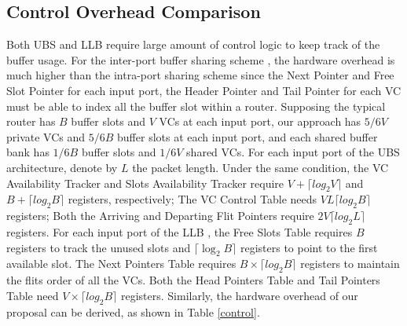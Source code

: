 \documentclass[10pt,conference]{IEEEtran}
\begin{document}
\subsection{Control Overhead Comparison}\label{controllogic}
Both UBS \cite{NPKV06}\cite{5770788} and LLB \cite{4555894}\cite{Neishaburi:2009:RAN:1531542.1531658} require large amount of control logic to keep track of the buffer usage. For the inter-port buffer sharing scheme \cite{Neishaburi:2009:RAN:1531542.1531658}, the hardware overhead is much higher than the intra-port sharing scheme since the Next Pointer and Free Slot Pointer for each input port, the Header Pointer and Tail Pointer for each VC must be able to index all the buffer slot within a router. Supposing the typical router \cite{NPKV06}\cite{5770788}\cite{4555894}\cite{Neishaburi:2009:RAN:1531542.1531658} has $B$ buffer slots and $V$ VCs at each input port, our approach has $5/6V$ private VCs and $5/6B$ buffer slots at each input port, and each shared buffer bank has $1/6B$ buffer slots and $1/6V$ shared VCs. For each input port of the UBS architecture, denote by $L$ the packet length. Under the same condition, the VC Availability Tracker and Slots Availability Tracker require $V+\lceil log_2 V\rceil$ and $B+\lceil log_2B\rceil$ registers, respectively; The VC Control Table needs $VL\lceil log_2B\rceil$ registers; Both the Arriving and Departing Flit Pointers require $2V\lceil log_2 L\rceil$ registers. For each input port of the LLB \cite{4555894}, the Free Slots Table requires $B$ registers to track the unused slots and $\lceil \log_2 B\rceil$ registers to point to the first available slot. The Next Pointers Table requires $B\times \lceil log_2 B\rceil$ registers to maintain the flits order of all the VCs. Both the Head Pointers Table and Tail Pointers Table need $V\times \lceil log_2 B\rceil$ registers. Similarly, the hardware overhead of our proposal can be derived, as shown in Table \ref{control}.

\end{document}
